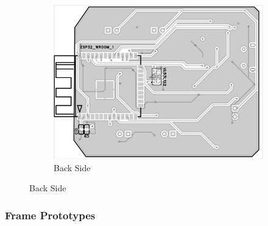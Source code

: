 \begin{figure}[H]
\begin{subfigure}[b]{0.4\linewidth}
        \includegraphics[width=\linewidth]{img/PCBit2_back.png}
        \caption{Back Side}
        \label{fig:pcb2-back}
    \end{subfigure}
    \label{fig:pcb2}
\end{figure}

\pagebreak
\subsubsection{Frame Prototypes}

